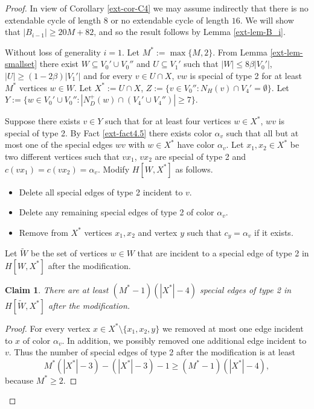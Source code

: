 \documentclass{article}
\newtheorem{claim}[theorem]{Claim}
\begin{document}
\begin{proof}
In view of Corollary \ref{ext-cor-C4} we may assume indirectly that there is no extendable cycle of length $8$ or no extendable cycle of length $16$.  We will show that $|B_{i-1}| \geq 20M + 82$, and so the result follows by Lemma \ref{ext-lem-B_i}.


Without loss of generality $i=1$. 
Let $M^*:=\max\{M,2\}$. From Lemma \ref{ext-lem-smallset} there exist $W\subseteq V_0'\cup V_0''$ and $U\subseteq V_1'$ such that $|W|\leq 8\beta |V_0'|$, $|U|\geq (1-2\beta)|V_1'|$ and for every $v\in U\cap X$, $vw$ is special of type 2 for at least $M^*$  vertices $w\in W$. 
Let $X^*:= U\cap X$, $Z:=\{v\in V_0'': N_H(v)\cap V_4'=\emptyset\}$. Let $Y:=\{w\in V_0'
\cup V_0'':|N^+_D(w)\cap (V_4'\cup V_4'')|\geq 7\}.$

Suppose there exists $v\in Y$ such that for at least four vertices $w\in X^*$, $wv$ 
 is special of type 2. By Fact \ref{ext-fact4.5} there exists color $\alpha_v$ such that all but at most one of the special edges $wv$ with $w\in X^*$  have color $\alpha_v$.
Let $x_1,x_2\in X^*$ be two different vertices such that $vx_1$, $vx_2$ are special of type 2 and $c(vx_1)=c(vx_2)=\alpha_v$. Modify $H[W,X^*]$ as follows.
\begin{itemize}
    \item[(a)] Delete all special edges of type 2 incident to $v$.
    \item[(b)] Delete any remaining special edges of type 2 of color $\alpha_v$.
    \item[(c)] Remove from $X^*$ vertices $x_1,x_2$ and vertex $y$ such that $c_y=\alpha_v$ if it exists.
\end{itemize}
Let $\widetilde{W}$ be the set of vertices $w\in W$ that are incident to a special edge of type 2 in $H[W,X^*]$ after the modification.
\begin{claim}\label{cl1-ext-lem-M=1} There are at least $(M^*-1)(|X^*|-4)$ special edges of type 2 in $H[\widetilde{W}, X^*]$ after the modification.
\end{claim}
\begin{proof}
For every vertex $x\in X^*\setminus \{x_1,x_2,y\}$ we removed at most one edge incident to $x$ of color $\alpha_v$. In addition, we possibly removed one additional edge incident to $v$. Thus the number of special edges of type 2 after the modification is at least 
$$M^*(|X^*|-3)-(|X^*|-3)- 1\geq (M^*-1)(|X^*|-4),$$
because $M^*\geq 2$.
\end{proof}


\end{proof}
\end{document}
